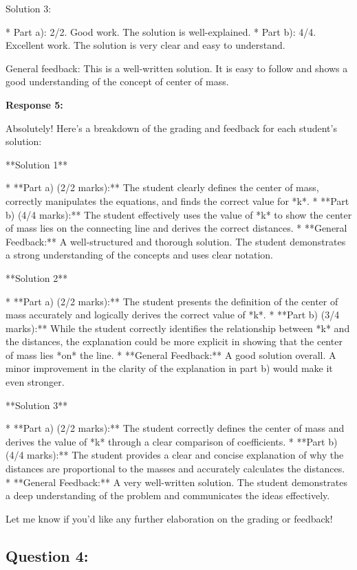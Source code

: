\documentclass[a4paper,11pt]{article}
\begin{document}
Solution 3:

*   Part a): 2/2. Good work. The solution is well-explained.
*   Part b): 4/4. Excellent work. The solution is very clear and easy to understand.

General feedback: This is a well-written solution. It is easy to follow and shows a good understanding of the concept of center of mass.

\bigskip    
\textbf{Response 5:}

Absolutely! Here's a breakdown of the grading and feedback for each student's solution:

**Solution 1**

*   **Part a) (2/2 marks):** The student clearly defines the center of mass, correctly manipulates the equations, and finds the correct value for *k*.
*   **Part b) (4/4 marks):** The student effectively uses the value of *k* to show the center of mass lies on the connecting line and derives the correct distances.
*   **General Feedback:** A well-structured and thorough solution. The student demonstrates a strong understanding of the concepts and uses clear notation.

**Solution 2**

*   **Part a) (2/2 marks):** The student presents the definition of the center of mass accurately and logically derives the correct value of *k*.
*   **Part b) (3/4 marks):** While the student correctly identifies the relationship between *k* and the distances, the explanation could be more explicit in showing that the center of mass lies *on* the line.
*   **General Feedback:** A good solution overall. A minor improvement in the clarity of the explanation in part b) would make it even stronger.

**Solution 3**

*   **Part a) (2/2 marks):** The student correctly defines the center of mass and derives the value of *k* through a clear comparison of coefficients.
*   **Part b) (4/4 marks):** The student provides a clear and concise explanation of why the distances are proportional to the masses and accurately calculates the distances.
*   **General Feedback:** A very well-written solution. The student demonstrates a deep understanding of the problem and communicates the ideas effectively. 

Let me know if you'd like any further elaboration on the grading or feedback! 

\subsection*{Question 4:}
\end{document}

